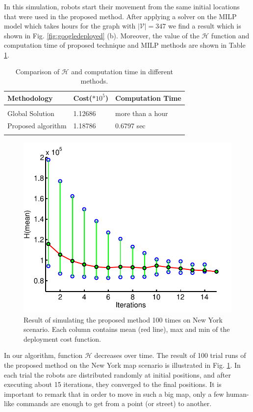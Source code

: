 \documentclass[smallcondensed]{svjour3}
\begin{document}
In this simulation, robots start their movement from the same initial locations that were used in the proposed method. After applying a solver on the MILP model which takes hours for the graph with $|\mathcal{V}|=347$ we find a result which is shown in Fig. \ref{fig:googledeployed} (b). Moreover, the value of the $\mathcal{H}$ function and computation time of proposed technique and MILP methods are shown in Table \ref{tbl:comparison}.

\begin{table}[t]
\centering
\caption{Comparison of $\mathcal{H}$ and computation time in different methods. }
\label{tbl:comparison}
\begin{tabular}{m{2.65cm}m{1.5cm}m{2.4cm}}
Methodology    & Cost($*10^5$) & Computation Time  \\
 \hline\\
 Global Solution   &  1.12686 & more than a hour\\
Proposed algorithm & 1.18786  & 0.6797 sec\\
\hline\\
\end{tabular}
\end{table}

\begin{figure}
\centering
\includegraphics[width=0.7 \columnwidth]{Figures/Fig14.pdf}
\caption{Result of simulating the proposed method 100 times on New York scenario. Each column contains mean (red line), max and min of the deployment cost function.}
\label{fig:100sim}
\end{figure}

In our algorithm, function $\mathcal{H}$ decreases over time. The result of 100 trial runs of the proposed method on the New York map scenario is illustrated in Fig. \ref{fig:100sim}. In each trial the robots are distributed randomly at initial positions, and after executing about 15 iterations, they converged to the final positions. It is important to remark that in order to move in such a big map, only a few human-like commands are enough to get from a point (or street) to another.
\end{document}
